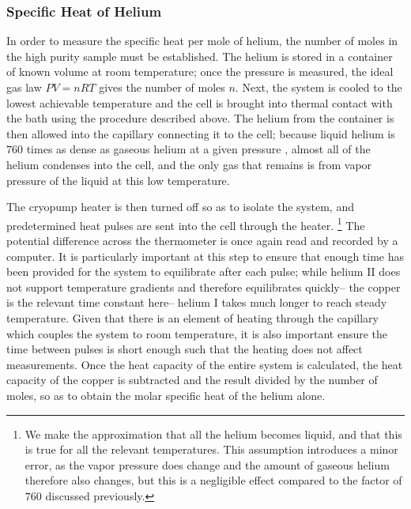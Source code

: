 \subsubsection{Specific Heat of Helium}
In order to measure the specific heat per mole of helium, the number
of moles in the high purity sample must be established. The helium is
stored in a container of known volume at room temperature; once the
pressure is measured, the ideal gas law $P V = n R T$ gives the number
of moles $n$. Next, the system is cooled to the lowest achievable
temperature and the cell is brought into thermal contact with the bath
using the procedure described above. The helium from the container is
then allowed into the capillary connecting it to the cell; because
liquid helium is $760$ times as dense as gaseous helium at a given
pressure \cite{shi}, almost all of the helium condenses into the cell,
and the only gas that remains is from vapor pressure of the liquid at
this low temperature. 

The cryopump heater is then turned off so as to isolate the system,
and predetermined heat pulses are sent into the cell through the
heater. \footnote{We make the approximation that all the helium
  becomes liquid, and that this is true for all the relevant
  temperatures. This assumption introduces a minor error, as the vapor
  pressure does change and the amount of gaseous helium therefore also
  changes, but this is a negligible effect compared to the factor of
  $760$ discussed previously.} The potential difference across the
thermometer is once again read and recorded by a computer. It is
particularly important at this step to ensure that enough time has
been provided for the system to equilibrate after each pulse; while
helium II does not support temperature gradients and therefore
equilibrates quickly-- the copper is the relevant time constant here--
helium I takes much longer to reach steady temperature. Given that
there is an element of heating through the capillary which couples the
system to room temperature, it is also important ensure the time
between pulses is short enough such that the heating does not affect
measurements.  Once the heat capacity of the entire system is
calculated, the heat capacity of the copper is subtracted and the
result divided by the number of moles, so as to obtain the molar
specific heat of the helium alone.
